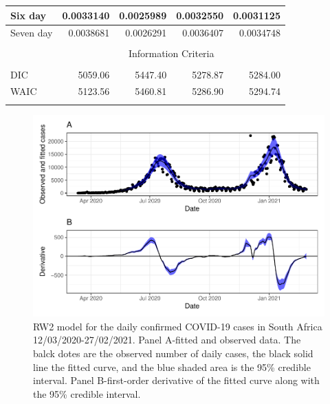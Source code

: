 \documentclass[10pt,letterpaper]{article}
\begin{document}
\begin{table}[!h]
\begin{tabular}[t]{lrrrr}
		\hline
		Six day & 0.0033140 & 0.0025989 & 0.0032550 & 0.0031125\\
		\hline
		Seven day & 0.0038681 & 0.0026291 & 0.0036407 & 0.0034748\\
		\hline\\
		& \multicolumn{4}{c}{Information Criteria}\\
		\hline\\
		DIC & 5059.06 & 5447.40 & 5278.87 & 5284.00\\
		WAIC & 5123.56 & 5460.81 & 5286.90 & 5294.74\\
		\hline\\
	\end{tabular}
\end{table}

\begin{figure}[H]
	\includegraphics[width=0.95\linewidth]{COVIDincidenceSA_files/figure-latex/unnamed-chunk-7-1} \caption{RW2 model for the daily confirmed COVID-19 cases in South Africa 12/03/2020-27/02/2021.  Panel A-fitted and observed data. The balck dotes are the observed number of daily cases, the black solid line the fitted curve, and the blue shaded area is the 95\% credible interval. Panel B-first-order derivative of the fitted curve along with the 95\% credible interval.}\label{fig:unnamed-chunk-7}
\end{figure}
\end{document}
